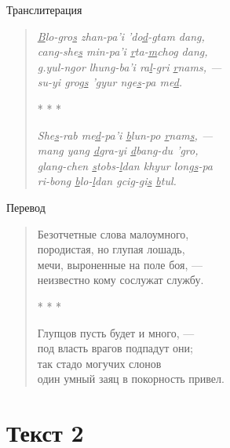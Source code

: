 \begin{center}Транслитерация\end{center}

\begin{verse}
	\emph{\ul{B}lo-gro\ul{s} zhan-pa'i 'do\ul{d}-gtam dang,}\\
	\emph{cang-she\ul{s} min-pa'i \ul{r}ta-\ul{m}chog dang,}\\
	\emph{\ul{g}.yul-ngor lhung-ba'i ra\ul{l}-gri \ul{r}nams, ---}\\
	\emph{su-yi grog\ul{s} 'gyur nge\ul{s}-pa me\ul{d}.}

	* * *
	
	\emph{She\ul{s}-rab me\ul{d}-pa'i \ul{b}lun-po \ul{r}nam\ul{s}, ---}\\
	\emph{mang yang \ul{d}gra-yi \ul{d}bang-du 'gro,}\\
	\emph{\ul{g}lang-chen \ul{s}tob{s}-\ul{l}dan khyur long\ul{s}-pa}\\
	\emph{ri-bong \ul{b}lo-\ul{l}dan \ul{g}cig-gi\ul{s} \ul{b}tul.}
\end{verse}

\begin{center}Перевод\end{center}

\begin{verse}
	Безотчетные слова малоумного,\\
	породистая, но глупая лошадь,\\
	мечи, выроненные на поле боя, ---\\
	неизвестно кому сослужат службу.
	
	* * *

	Глупцов пусть будет и много, ---\\
	под власть врагов подпадут они;\\
	так стадо могучих слонов\\
	один умный заяц в покорность привел.
\end{verse}

\pagebreak

\section{Текст 2}


